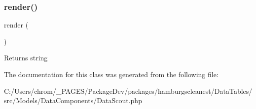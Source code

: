 \subsubsection{\texorpdfstring{render()}{render()}}
{\footnotesize\ttfamily render (\begin{DoxyParamCaption}{ }\end{DoxyParamCaption})}

\begin{DoxyReturn}{Returns}
string 
\end{DoxyReturn}


The documentation for this class was generated from the following file\+:\begin{DoxyCompactItemize}
\item 
C\+:/\+Users/chrom/\+\_\+\+P\+A\+G\+E\+S/\+Package\+Dev/packages/hamburgscleanest/\+Data\+Tables/src/\+Models/\+Data\+Components/Data\+Scout.\+php\end{DoxyCompactItemize}
